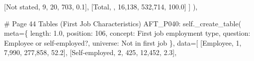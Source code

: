 \documentclass[
  11pt,
  a4paper,
]{article}
\newenvironment{Shaded}{\begin{snugshade}}{\end{snugshade}}
\newcommand{\CommentTok}[1]{\textcolor[rgb]{0.37,0.37,0.37}{#1}}
\newcommand{\NormalTok}[1]{\textcolor[rgb]{0.00,0.23,0.31}{#1}}
\newcommand{\OperatorTok}[1]{\textcolor[rgb]{0.37,0.37,0.37}{#1}}
\newcommand{\StringTok}[1]{\textcolor[rgb]{0.13,0.47,0.30}{#1}}
\newcommand{\VariableTok}[1]{\textcolor[rgb]{0.07,0.07,0.07}{#1}}
\begin{document}
\begin{Shaded}
\begin{Highlighting}[]
\NormalTok{            [}\StringTok{\textquotesingle{}Not stated\textquotesingle{}}\NormalTok{, }\StringTok{\textquotesingle{}9\textquotesingle{}}\NormalTok{, }\StringTok{\textquotesingle{}20\textquotesingle{}}\NormalTok{, }\StringTok{\textquotesingle{}703\textquotesingle{}}\NormalTok{, }\StringTok{\textquotesingle{}0.1\textquotesingle{}}\NormalTok{],}
\NormalTok{            [}\StringTok{\textquotesingle{}Total\textquotesingle{}}\NormalTok{, }\StringTok{\textquotesingle{}\textquotesingle{}}\NormalTok{, }\StringTok{\textquotesingle{}16,138\textquotesingle{}}\NormalTok{, }\StringTok{\textquotesingle{}532,714\textquotesingle{}}\NormalTok{, }\StringTok{\textquotesingle{}100.0\textquotesingle{}}\NormalTok{]}
\NormalTok{        ]}
\NormalTok{    ),}

    \CommentTok{\# Page 44 Tables (First Job Characteristics)}
    \StringTok{\textquotesingle{}AFT\_P040\textquotesingle{}}\NormalTok{: }\VariableTok{self}\NormalTok{.\_create\_table(}
\NormalTok{        meta}\OperatorTok{=}\NormalTok{\{}
            \StringTok{\textquotesingle{}length\textquotesingle{}}\NormalTok{: }\StringTok{\textquotesingle{}1.0\textquotesingle{}}\NormalTok{, }\StringTok{\textquotesingle{}position\textquotesingle{}}\NormalTok{: }\StringTok{\textquotesingle{}106\textquotesingle{}}\NormalTok{,}
            \StringTok{\textquotesingle{}concept\textquotesingle{}}\NormalTok{: }\StringTok{\textquotesingle{}First job employment type\textquotesingle{}}\NormalTok{,}
            \StringTok{\textquotesingle{}question\textquotesingle{}}\NormalTok{: }\StringTok{\textquotesingle{}Employee or self{-}employed?\textquotesingle{}}\NormalTok{,}
            \StringTok{\textquotesingle{}universe\textquotesingle{}}\NormalTok{: }\StringTok{\textquotesingle{}Not in first job\textquotesingle{}}
\NormalTok{        \},}
\NormalTok{        data}\OperatorTok{=}\NormalTok{[}
\NormalTok{            [}\StringTok{\textquotesingle{}Employee\textquotesingle{}}\NormalTok{, }\StringTok{\textquotesingle{}1\textquotesingle{}}\NormalTok{, }\StringTok{\textquotesingle{}7,990\textquotesingle{}}\NormalTok{, }\StringTok{\textquotesingle{}277,858\textquotesingle{}}\NormalTok{, }\StringTok{\textquotesingle{}52.2\textquotesingle{}}\NormalTok{],}
\NormalTok{            [}\StringTok{\textquotesingle{}Self{-}employed\textquotesingle{}}\NormalTok{, }\StringTok{\textquotesingle{}2\textquotesingle{}}\NormalTok{, }\StringTok{\textquotesingle{}425\textquotesingle{}}\NormalTok{, }\StringTok{\textquotesingle{}12,452\textquotesingle{}}\NormalTok{, }\StringTok{\textquotesingle{}2.3\textquotesingle{}}\NormalTok{],}

\end{Highlighting}
\end{Shaded}
\end{document}
